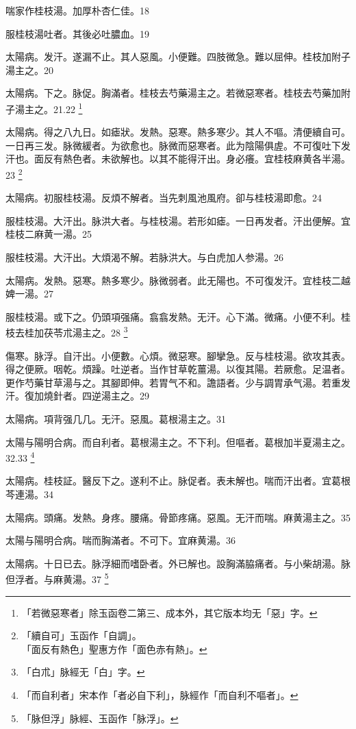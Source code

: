 \documentclass[b5paper,twoside,zihao=-4,UTF8]{ctexbook}
\begin{document}
喘家作桂枝湯。加厚朴杏仁佳。18

服桂枝湯吐者。其後必吐膿血。19

太陽病。发汗。遂漏不止。其人惡風。小便難。四肢微急。難以屈伸。桂枝加附子湯主之。20

太陽病。下之。脉促。胸滿者。桂枝去芍藥湯主之。若微{惡}寒者。桂枝去芍藥加附子湯主之。21.22
	\footnote{「若微惡寒者」除玉函卷二第三、成本外，其它版本均无「惡」字。}


太陽病。得之八九日。如瘧狀。发熱。惡寒。熱多寒少。其人不嘔。清便續自可。一日再三发。脉微緩者。为欲愈也。脉微而惡寒者。此为陰陽俱虗。不可復{吐下}发汗也。面反有熱色者。未欲解也。以其不能得汗出。身必癢。宜桂枝麻黄各半湯。23
	\footnote{「續自可」玉函作「自調」。\\「面反有熱色」聖惠方作「面色赤有熱」。}

太陽病。初服桂枝湯。反煩不解者。当先刺風池風府。卻与桂枝湯即愈。24

服桂枝湯。大汗出。脉洪大者。与桂枝湯。若形如瘧。一日再发者。汗出便解。宜桂枝二麻黄一湯。25

服桂枝湯。大汗出。大煩渴不解。若脉洪大。与白虎{加人参}湯。26

太陽病。发熱。惡寒。熱多寒少。脉微弱者。此无陽也。不可{復}发汗。{宜桂枝二越婢一湯。}27

服桂枝湯。{或}下之。仍頭項强痛。翕翕发熱。无汗。心下滿。微痛。小便不利。桂枝去桂加茯苓朮湯主之。28
	\footnote{「白朮」脉經无「白」字。}

傷寒。脉浮。自汗出。小便數。心煩。微惡寒。腳攣急。反与桂枝湯。欲攻其表。得之便厥。咽乾。煩躁。吐逆者。当作甘草乾薑湯。以復其陽。若厥愈。足温者。更作芍藥甘草湯与之。其腳即伸。若胃气不和。譫語者。少与{調胃}承气湯。若重发汗。復加燒針者。四逆湯主之。29

太陽病。項背强几几。无汗。惡風。葛根湯主之。31

太陽与陽明合病。而自利{者}。葛根湯主之。不下利。但嘔者。葛根加半夏湯主之。32.33
	\footnote{「而自利者」宋本作「者必自下利」，脉經作「而自利不嘔者」。}

太陽病。桂枝証。醫反下之。遂利不止。脉促者。表未解也。喘而汗出者。宜葛根芩連湯。34

太陽病。頭痛。发熱。身疼。腰痛。骨節疼痛。惡風。无汗而喘。麻黄湯主之。35

太陽与陽明合病。喘而胸滿者。不可下。宜麻黄湯。36

太陽病。十日已去。脉浮細而嗜卧者。外已解也。設胸滿脇痛者。与小柴胡湯。脉{但}浮者。与麻黄湯。37
	\footnote{「脉但浮」脉經、玉函作「脉浮」。}
\end{document}
